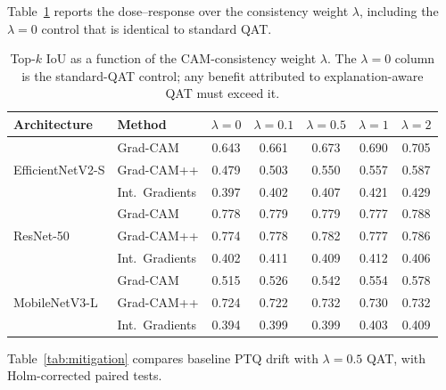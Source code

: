 \documentclass[fleqn,10pt]{wlscirep}
\begin{document}
Table~\ref{tab:lambda_sweep} reports the dose--response over the consistency weight $\lambda$, including the $\lambda = 0$ control that is identical to standard QAT.

\begin{table}[!ht]
\centering
\scriptsize
\caption{Top-$k$ IoU as a function of the CAM-consistency weight $\lambda$. The $\lambda = 0$ column is the standard-QAT control; any benefit attributed to explanation-aware QAT must exceed it.}
\label{tab:lambda_sweep}
\setlength{\tabcolsep}{5pt}
\begin{tabular}{ll ccccc}
\toprule
\textbf{Architecture} & \textbf{Method} & $\lambda=0$ & $\lambda=0.1$ & $\lambda=0.5$ & $\lambda=1$ & $\lambda=2$ \\
\midrule
\multirow{3}{*}{EfficientNetV2-S}
 & Grad-CAM & 0.643 & 0.661 & 0.673 & 0.690 & 0.705 \\
 & Grad-CAM++ & 0.479 & 0.503 & 0.550 & 0.557 & 0.587 \\
 & Int.\ Gradients & 0.397 & 0.402 & 0.407 & 0.421 & 0.429 \\
\midrule
\multirow{3}{*}{ResNet-50}
 & Grad-CAM & 0.778 & 0.779 & 0.779 & 0.777 & 0.788 \\
 & Grad-CAM++ & 0.774 & 0.778 & 0.782 & 0.777 & 0.786 \\
 & Int.\ Gradients & 0.402 & 0.411 & 0.409 & 0.412 & 0.406 \\
\midrule
\multirow{3}{*}{MobileNetV3-L}
 & Grad-CAM & 0.515 & 0.526 & 0.542 & 0.554 & 0.578 \\
 & Grad-CAM++ & 0.724 & 0.722 & 0.732 & 0.730 & 0.732 \\
 & Int.\ Gradients & 0.394 & 0.399 & 0.399 & 0.403 & 0.409 \\
\bottomrule
\end{tabular}
\end{table}

Table~\ref{tab:mitigation} compares baseline PTQ drift with $\lambda = 0.5$ QAT, with Holm-corrected paired tests.
\end{document}
